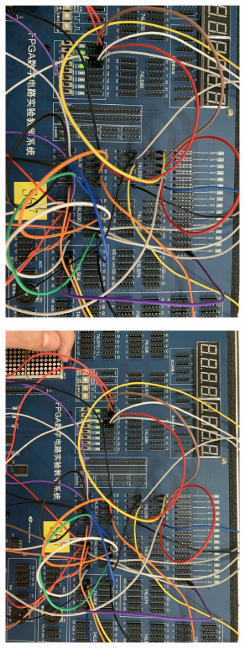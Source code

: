 \documentclass[UTF8, a4paper, 11pt]{article}
\begin{document}
\begin{figure}[H]
    \centering
    \includegraphics[width=0.8\textwidth]{1010.JPG}
\end{figure}
\begin{figure}[H]
    \centering
    \includegraphics[width=0.8\textwidth]{1011.JPG}
\end{figure}
\end{document}
